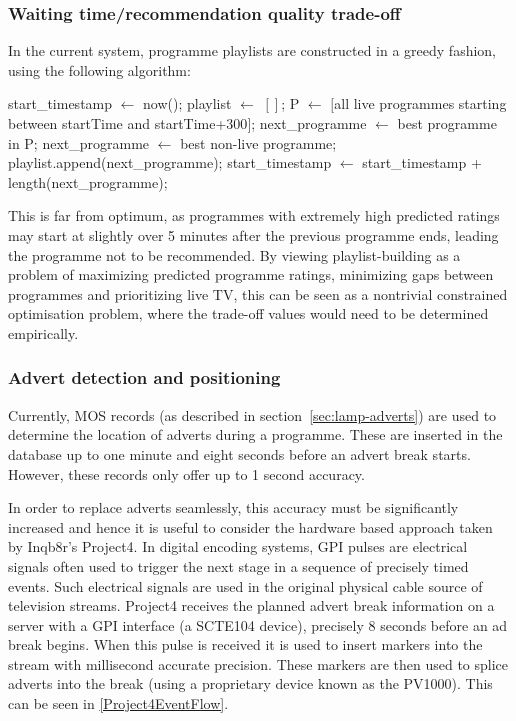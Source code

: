 	\subsubsection{Waiting time/recommendation quality trade-off}
	In the current system, programme playlists are constructed in a greedy fashion, using the following algorithm:
	\begin{algorithmic}[H]
	\State start\_timestamp $\gets$ now();
	\State playlist $\gets$ $[]$;
		\State P $\gets$ $[$all live programmes starting between startTime and startTime+300$]$;
			\State next\_programme $\gets$ best programme in P;
		\Else
			\State next\_programme $\gets$ best non-live programme;
		\EndIf
		\State playlist.append(next\_programme);
		\State start\_timestamp $\gets$ start\_timestamp + length(next\_programme);
	\EndWhile
	\end{algorithmic}
	This is far from optimum, as programmes with extremely high predicted ratings may start at slightly over 5 minutes after the previous programme ends, leading the programme not to be recommended. By viewing playlist-building as a problem of maximizing predicted programme ratings, minimizing gaps between programmes and prioritizing live TV, this can be seen as a nontrivial constrained optimisation problem, where the trade-off values would need to be determined empirically.

	\subsubsection{Advert detection and positioning}

	Currently, MOS records (as described in section~\ref{sec:lamp-adverts}) are used to determine the location of adverts during a programme. These are inserted in the database up to one minute and eight seconds before an advert break starts. However, these records only offer up to 1 second accuracy.

	In order to replace adverts seamlessly, this accuracy must be significantly increased and hence it is useful to consider the hardware based approach taken by Inqb8r's Project4. In digital encoding systems, GPI pulses are electrical signals often used to trigger the next stage in a sequence of precisely timed events. Such electrical signals are used in the original physical cable source of television streams. Project4 receives the planned advert break information on a server with a GPI interface (a SCTE104 device\citep{SCTE104}), precisely 8 seconds before an ad break begins. When this pulse is received it is used to insert markers into the stream with millisecond accurate precision. These markers are then used to splice adverts into the break (using a proprietary device known as the PV1000). This can be seen in \ref{Project4EventFlow}.

